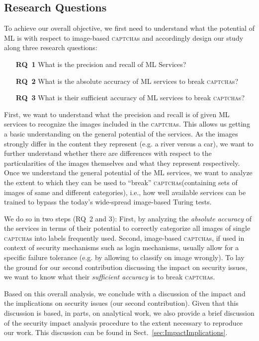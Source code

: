 \documentclass[sigconf,review,anonymous]{acmart}
\newcommand{\captchas}{\textsc{captcha}s\xspace}
\begin{document}
\subsection{Research Questions}
To achieve our overall objective, we first need to understand what the potential of ML is with respect to image-based \captchas and accordingly design our study along three research questions:
\begin{itemize}
\item[\textbf{RQ~1}] What is the precision and recall of ML Services?
\item[\textbf{RQ~2}] What is the absolute accuracy of ML services to break \captchas? 
\item[\textbf{RQ~3}] What is their sufficient accuracy of ML services to break \captchas? 
\end{itemize}

First, we want to understand what the precision and recall is of given ML services to recognize the images included in the \captchas. This allows us getting a basic understanding on the general potential of the services. As the images strongly differ in the content they represent (e.g. a river versus a car), we want to further understand whether there are differences with respect to the particularities of the images themselves and what they represent respectively. Once we understand the general potential of the ML services, we want to analyze the extent to which they can be used to ``break'' \captchas (containing sets of images of same and different categories), i.e., how well available services can be trained to bypass the today's wide-spread image-based Turing tests.

We do so in two steps (RQ~2 and 3): First, by analyzing the \emph{absolute accuracy} of the services in terms of their potential to correctly categorize all images of single \captchas into labels frequently used. Second, image-based \captchas, if used in context of security mechanisms such as login mechanisms, usually allow for a specific failure tolerance (e.g. by allowing to classify on image wrongly). To lay the ground for our second contribution discussing the impact on security issues, we want to know what their \emph{sufficient accuracy} is to break \captchas. 

Based on this overall analysis, we conclude with a discussion of the impact and the implications on security issues (our second contribution). Given that this discussion is based, in parts, on analytical work, we also provide a brief discussion of the security impact analysis procedure to the extent necessary to reproduce our work. This discussion can be found in Sect.~\ref{sec:ImpactImplications}.
\end{document}
